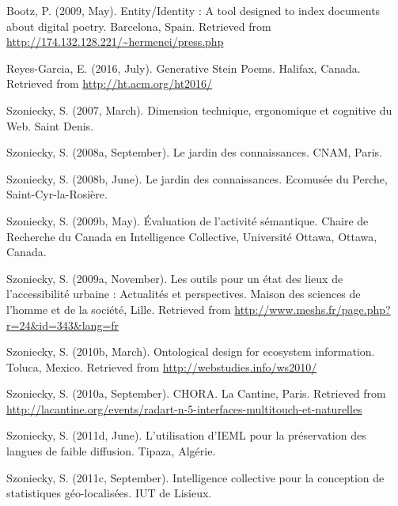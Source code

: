 \documentclass[
  a4paper,
  DIV=11,
  numbers=noendperiod]{scrreprt}
\newlength{\cslhangindent}
\newenvironment{CSLReferences}[2] %
 {\begin{list}{}{%
  \setlength{\itemindent}{0pt}
  \setlength{\leftmargin}{0pt}
  \setlength{\parsep}{0pt}
  \ifodd #1
   \setlength{\leftmargin}{\cslhangindent}
   \setlength{\itemindent}{-1\cslhangindent}
  \fi
  \setlength{\itemsep}{#2\baselineskip}}}
 {\end{list}}
\begin{document}
\label{refs-presentation}
\begin{CSLReferences}{1}{0}
Bootz, P. (2009, May). Entity/{Identity} : {A} tool designed to index
documents about digital poetry. Barcelona, Spain. Retrieved from
\url{http://174.132.128.221/~hermenei/press.php}

Reyes-Garcia, E. (2016, July). Generative {Stein} {Poems}. Halifax,
Canada. Retrieved from \url{http://ht.acm.org/ht2016/}

Szoniecky, S. (2007, March). Dimension technique, ergonomique et
cognitive du {Web}. Saint Denis.

Szoniecky, S. (2008a, September). Le jardin des connaissances. CNAM,
Paris.

Szoniecky, S. (2008b, June). Le jardin des connaissances. Ecomusée du
Perche, Saint-Cyr-la-Rosière.

Szoniecky, S. (2009b, May). Évaluation de l'activité sémantique. Chaire
de Recherche du Canada en Intelligence Collective, Université Ottawa,
Ottawa, Canada.

Szoniecky, S. (2009a, November). Les outils pour un état des lieux de
l'accessibilité urbaine : Actualités et perspectives. Maison des
sciences de l'homme et de la société, Lille. Retrieved from
\url{http://www.meshs.fr/page.php?r=24&id=343&lang=fr}

Szoniecky, S. (2010b, March). Ontological design for ecosystem
information. Toluca, Mexico. Retrieved from
\url{http://webstudies.info/ws2010/}

Szoniecky, S. (2010a, September). {CHORA}. La Cantine, Paris. Retrieved
from
\url{http://lacantine.org/events/radart-n-5-interfaces-multitouch-et-naturelles}

Szoniecky, S. (2011d, June). L'utilisation d'{IEML} pour la préservation
des langues de faible diffusion. Tipaza, Algérie.

Szoniecky, S. (2011c, September). Intelligence collective pour la
conception de statistiques géo-localisées. IUT de Lisieux.


\end{CSLReferences}
\end{document}
